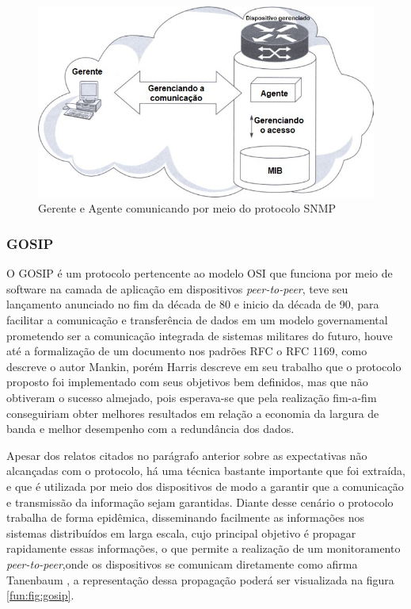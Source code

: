 \begin{figure}[H]
	\begin{center}
	\includegraphics[scale = 0.70]{img/SNMP-Execution.jpg}
		\caption{Gerente e Agente comunicando por meio do protocolo SNMP\cite{nadeau2003mpls}}
		\label{fun:fig:snmpexecution}
	\end{center}
\end{figure}


\subsubsection{GOSIP}

O \acrshort{GOSIP} é um protocolo pertencente ao modelo \acrshort{OSI} que funciona por meio de software na camada de aplicação em dispositivos \textit{peer-to-peer}, teve seu lançamento anunciado no fim da década de 80 e inicio da década de 90, para facilitar a comunicação e transferência de dados em um modelo governamental prometendo ser a comunicação integrada de sistemas militares do futuro, houve até a formalização de um documento nos padrões \acrshort{RFC} o RFC 1169, como descreve o autor Mankin\cite{mankin1991towards}, porém Harris\cite{harris1992tactical} descreve em seu trabalho que o protocolo proposto foi implementado com seus objetivos bem definidos, mas que não obtiveram o sucesso almejado, pois esperava-se que pela realização fim-a-fim conseguiriam obter melhores resultados em relação a economia da largura de banda e melhor desempenho com a redundância dos dados.

Apesar dos relatos citados no parágrafo anterior sobre as expectativas não alcançadas com o protocolo, há uma técnica bastante importante que foi extraída, e que é utilizada por meio dos dispositivos de modo a garantir que a comunicação e transmissão da informação sejam garantidas. Diante desse cenário o protocolo trabalha de forma epidêmica, disseminando facilmente as informações nos sistemas distribuídos em larga escala, cujo principal objetivo é propagar rapidamente essas informações, o que permite a realização de um monitoramento \textit{peer-to-peer},onde os dispositivos se comunicam diretamente como afirma Tanenbaum \cite{tanenbaum2007distributed}, a representação dessa propagação poderá ser visualizada na figura \ref{fun:fig:gosip}. 

